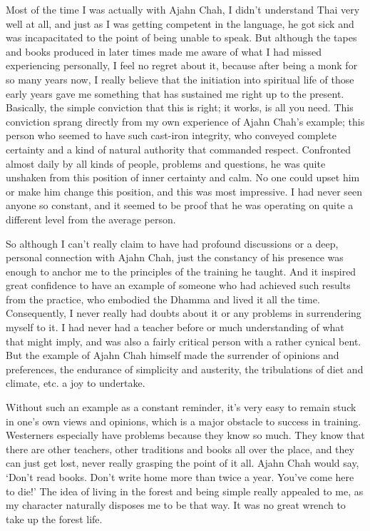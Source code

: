 Most of the time I was actually with Ajahn Chah, I didn't understand
Thai very well at all, and just as I was getting competent in the
language, he got sick and was incapacitated to the point of being unable
to speak. But although the tapes and books produced in later times made
me aware of what I had missed experiencing personally, I feel no regret
about it, because after being a monk for so many years now, I really
believe that the initiation into spiritual life of those early years
gave me something that has sustained me right up to the present.
Basically, the simple conviction that this is right; it works, is all
you need. This conviction sprang directly from my own experience of
Ajahn Chah's example; this person who seemed to have such cast-iron
integrity, who conveyed complete certainty and a kind of natural
authority that commanded respect. Confronted almost daily by all kinds
of people, problems and questions, he was quite unshaken from this
position of inner certainty and calm. No one could upset him or make him
change this position, and this was most impressive. I had never seen
anyone so constant, and it seemed to be proof that he was operating on
quite a different level from the average person.

So although I can't really claim to have had profound discussions or a
deep, personal connection with Ajahn Chah, just the constancy of his
presence was enough to anchor me to the principles of the training he
taught. And it inspired great confidence to have an example of someone
who had achieved such results from the practice, who embodied the Dhamma
and lived it all the time. Consequently, I never really had doubts about
it or any problems in surrendering myself to it. I had never had a
teacher before or much understanding of what that might imply, and was
also a fairly critical person with a rather cynical bent. But the
example of Ajahn Chah himself made the surrender of opinions and
preferences, the endurance of simplicity and austerity, the tribulations
of diet and climate, etc. a joy to undertake.

Without such an example as a constant reminder, it's very easy to remain
stuck in one's own views and opinions, which is a major obstacle to
success in training. Westerners especially have problems because they
know so much. They know that there are other teachers, other traditions
and books all over the place, and they can just get lost, never really
grasping the point of it all. Ajahn Chah would say, `Don't read books.
Don't write home more than twice a year. You've come here to die!' The
idea of living in the forest and being simple really appealed to me, as
my character naturally disposes me to be that way. It was no great
wrench to take up the forest life.

